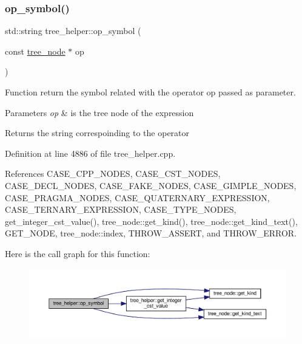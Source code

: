 \subsubsection{\texorpdfstring{op\+\_\+symbol()}{op\_symbol()}\hspace{0.1cm}{\footnotesize\ttfamily [2/2]}}
{\footnotesize\ttfamily std\+::string tree\+\_\+helper\+::op\+\_\+symbol (\begin{DoxyParamCaption}\item[{const \hyperlink{classtree__node}{tree\+\_\+node} $\ast$}]{op }\end{DoxyParamCaption})\hspace{0.3cm}{\ttfamily [static]}}



Function return the symbol related with the operator op passed as parameter. 


\begin{DoxyParams}{Parameters}
{\em op} & is the tree node of the expression \\
\hline
\end{DoxyParams}
\begin{DoxyReturn}{Returns}
the string correspoinding to the operator 
\end{DoxyReturn}


Definition at line 4886 of file tree\+\_\+helper.\+cpp.



References C\+A\+S\+E\+\_\+\+C\+P\+P\+\_\+\+N\+O\+D\+ES, C\+A\+S\+E\+\_\+\+C\+S\+T\+\_\+\+N\+O\+D\+ES, C\+A\+S\+E\+\_\+\+D\+E\+C\+L\+\_\+\+N\+O\+D\+ES, C\+A\+S\+E\+\_\+\+F\+A\+K\+E\+\_\+\+N\+O\+D\+ES, C\+A\+S\+E\+\_\+\+G\+I\+M\+P\+L\+E\+\_\+\+N\+O\+D\+ES, C\+A\+S\+E\+\_\+\+P\+R\+A\+G\+M\+A\+\_\+\+N\+O\+D\+ES, C\+A\+S\+E\+\_\+\+Q\+U\+A\+T\+E\+R\+N\+A\+R\+Y\+\_\+\+E\+X\+P\+R\+E\+S\+S\+I\+ON, C\+A\+S\+E\+\_\+\+T\+E\+R\+N\+A\+R\+Y\+\_\+\+E\+X\+P\+R\+E\+S\+S\+I\+ON, C\+A\+S\+E\+\_\+\+T\+Y\+P\+E\+\_\+\+N\+O\+D\+ES, get\+\_\+integer\+\_\+cst\+\_\+value(), tree\+\_\+node\+::get\+\_\+kind(), tree\+\_\+node\+::get\+\_\+kind\+\_\+text(), G\+E\+T\+\_\+\+N\+O\+DE, tree\+\_\+node\+::index, T\+H\+R\+O\+W\+\_\+\+A\+S\+S\+E\+RT, and T\+H\+R\+O\+W\+\_\+\+E\+R\+R\+OR.

Here is the call graph for this function\+:
\nopagebreak
\begin{figure}[H]
\begin{center}
\leavevmode
\includegraphics[width=350pt]{d7/d99/classtree__helper_a3bddb21e3d1fd325d9949e94c3e84381_cgraph}
\end{center}
\end{figure}
\mbox{\label{classtree__helper_a81bf6caaec59373f9e1a5690de590b40}} 
